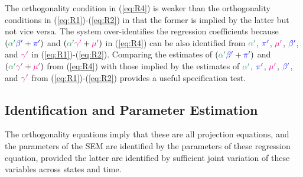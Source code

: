 \documentclass[11pt,reqno,letter]{amsart}
\theoremstyle{definition}
\def\bcolor{\color{ForestGreen}}
\def\pcolor{\color{blue}}
\def\icolor{\color{magenta}}
\begin{document}
The orthogonality condition in (\ref{eq:R4}) is weaker than the orthogonality conditions in  (\ref{eq:R1})-(\ref{eq:R2}) in that the former is implied by the latter but not vice versa.
The system over-identifies the regression coefficients because  $({\bcolor\alpha '}  {\pcolor \beta' }+{\pcolor\pi'})$ and $({\bcolor\alpha '}  {\icolor \gamma'} + {\icolor \mu'})$ in  (\ref{eq:R4}) can be also identified from  ${\bcolor\alpha ' }$,  $ {\pcolor\pi '}$, ${\icolor\mu'}$,   ${\pcolor \beta' }$, and ${\icolor \gamma'}$ in (\ref{eq:R1})-(\ref{eq:R2}).  Comparing the estimates of $({\bcolor\alpha '}  {\pcolor \beta' }+{\pcolor\pi'})$ and $({\bcolor\alpha '}  {\icolor \gamma'} + {\icolor \mu'})$ from  (\ref{eq:R4})  with  those implied by  the estimates of ${\bcolor\alpha ' }$,  $ {\pcolor\pi '}$, ${\icolor\mu'}$,   ${\pcolor \beta' }$, and ${\icolor \gamma'}$ from   (\ref{eq:R1})-(\ref{eq:R2}) provides a useful specification test.


\subsection*{Identification and Parameter Estimation}

The orthogonality equations imply that these are all projection equations, and the parameters of the SEM are identified by the parameters of these regression equation, provided the latter are identified by sufficient joint variation of these variables across states and time.
\end{document}

